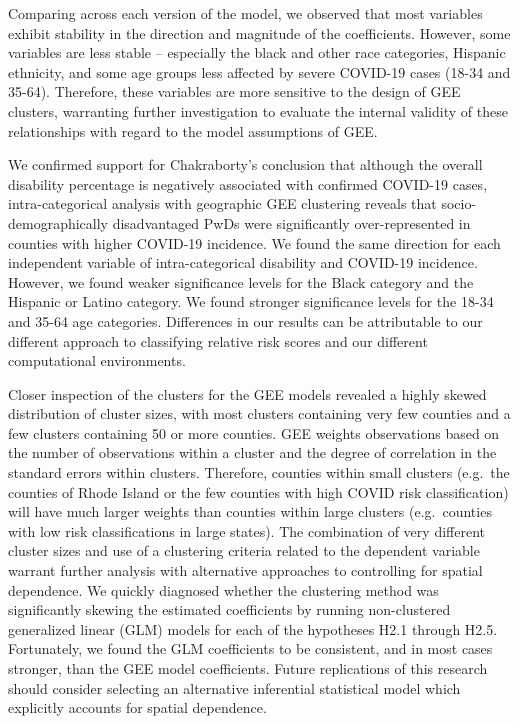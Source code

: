 \documentclass[
]{article}
\begin{document}
Comparing across each version of the model, we observed that most
variables exhibit stability in the direction and magnitude of the
coefficients. However, some variables are less stable -- especially the
black and other race categories, Hispanic ethnicity, and some age groups
less affected by severe COVID-19 cases (18-34 and 35-64). Therefore,
these variables are more sensitive to the design of GEE clusters,
warranting further investigation to evaluate the internal validity of
these relationships with regard to the model assumptions of GEE.

We confirmed support for Chakraborty's conclusion that although the
overall disability percentage is negatively associated with confirmed
COVID-19 cases, intra-categorical analysis with geographic GEE
clustering reveals that socio-demographically disadvantaged PwDs were
significantly over-represented in counties with higher COVID-19
incidence. We found the same direction for each independent variable of
intra-categorical disability and COVID-19 incidence. However, we found
weaker significance levels for the Black category and the Hispanic or
Latino category. We found stronger significance levels for the 18-34 and
35-64 age categories. Differences in our results can be attributable to
our different approach to classifying relative risk scores and our
different computational environments.

Closer inspection of the clusters for the GEE models revealed a highly
skewed distribution of cluster sizes, with most clusters containing very
few counties and a few clusters containing 50 or more counties. GEE
weights observations based on the number of observations within a
cluster and the degree of correlation in the standard errors within
clusters. Therefore, counties within small clusters (e.g.~the counties
of Rhode Island or the few counties with high COVID risk classification)
will have much larger weights than counties within large clusters
(e.g.~counties with low risk classifications in large states). The
combination of very different cluster sizes and use of a clustering
criteria related to the dependent variable warrant further analysis with
alternative approaches to controlling for spatial dependence. We quickly
diagnosed whether the clustering method was significantly skewing the
estimated coefficients by running non-clustered generalized linear (GLM)
models for each of the hypotheses H2.1 through H2.5. Fortunately, we
found the GLM coefficients to be consistent, and in most cases stronger,
than the GEE model coefficients. Future replications of this research
should consider selecting an alternative inferential statistical model
which explicitly accounts for spatial dependence.
\end{document}
